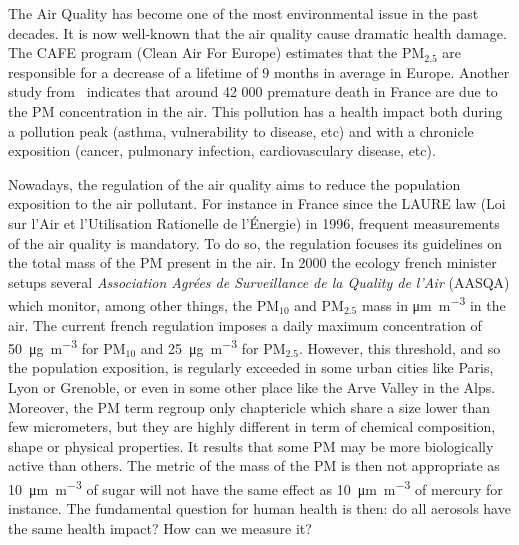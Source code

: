 \documentclass[a4paper,12pt]{memoir}
\newcommand{\PM}{\text{PM}}
\begin{document}
The Air Quality has become one of the most environmental issue in the past decades. It is
now well-known that the air quality cause dramatic health damage. The CAFE program (Clean
Air For Europe) estimates that the $\PM_{2.5}$ are responsible for a decrease of a
lifetime of 9 months in average in Europe. Another study from~\citet{amann_baseline_2005}
indicates that around 42 000 premature death in France are due to the PM concentration in
the air.  This pollution has a health impact both during a pollution peak (asthma,
vulnerability to disease, etc) and with a chronicle exposition (cancer, pulmonary
infection, cardiovasculary disease, etc).

Nowadays, the regulation of the air quality aims to reduce the population exposition to
the air pollutant. For instance in France since the LAURE law (Loi sur l'Air et
l'Utilisation Rationelle de l'Énergie) in 1996, frequent measurements of the air quality
is mandatory.  To do so, the regulation focuses its guidelines on the total mass of the PM
present in the air.  In 2000 the ecology french minister setups several \emph{Association
Agrées de Surveillance de la Quality de l'Air} (AASQA) which monitor, among other things,
the $\PM_{10}$ and $\PM_{2.5}$ mass in \si{\um\per\cubic\m} in the air.  The current
french regulation imposes a daily maximum concentration of \SI{50}{\ug\per\cubic\m} for
$\PM_{10}$ and \SI{25}{\ug\per\cubic\m} for $\PM_{2.5}$. However, this threshold, and so
the population exposition, is regularly exceeded in some urban cities like Paris, Lyon or
Grenoble, or even in some other place like the Arve Valley in the Alps.
Moreover, the PM term regroup only chaptericle which share a size lower than few micrometers,
but they are highly different in term of chemical composition, shape or physical
properties. It results that some PM may be more biologically active than others.  The
metric of the mass of the PM is then not appropriate as \SI{10}{\um\per\cubic\m} of sugar
will not have the same effect as \SI{10}{\um\per\cubic\m} of mercury for instance.  The
fundamental question for human health is then: do all aerosols have the same health
impact? How can we measure it? 
\end{document}

